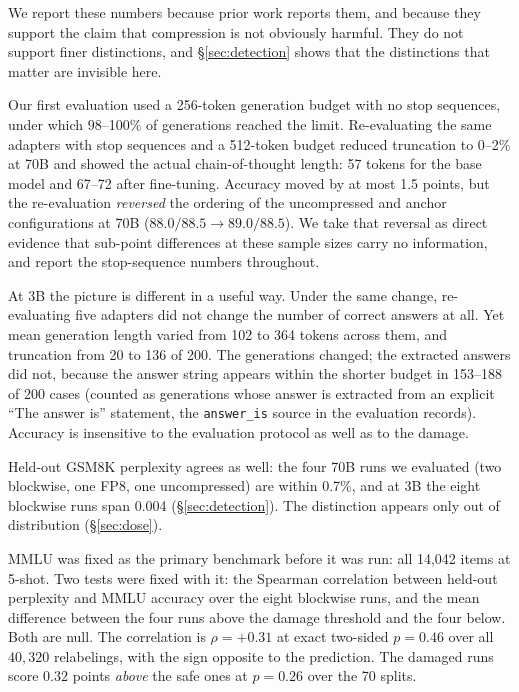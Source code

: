 \documentclass[11pt,letterpaper]{article}
\begin{document}
We report these numbers because prior work reports them, and because they support the claim that compression is not obviously harmful. They do not support finer distinctions, and \S\ref{sec:detection} shows that the distinctions that matter are invisible here.

\medskip
Our first evaluation used a 256-token generation budget with no stop sequences, under which 98--100\% of generations reached the limit. Re-evaluating the same adapters with stop sequences and a 512-token budget reduced truncation to 0--2\% at 70B and showed the actual chain-of-thought length: 57 tokens for the base model and 67--72 after fine-tuning. Accuracy moved by at most 1.5 points, but the re-evaluation \emph{reversed} the ordering of the uncompressed and anchor configurations at 70B ($88.0/88.5 \rightarrow 89.0/88.5$). We take that reversal as direct evidence that sub-point differences at these sample sizes carry no information, and report the stop-sequence numbers throughout.

At 3B the picture is different in a useful way. Under the same change, re-evaluating five adapters did not change the number of correct answers at all. Yet mean generation length varied from 102 to 364 tokens across them, and truncation from 20 to 136 of 200. The generations changed; the extracted answers did not, because the answer string appears within the shorter budget in 153--188 of 200 cases (counted as generations whose answer is extracted from an explicit ``The answer is'' statement, the \texttt{answer\_is} source in the evaluation records). Accuracy is insensitive to the evaluation protocol as well as to the damage.

\medskip
Held-out GSM8K perplexity agrees as well: the four 70B runs we evaluated (two blockwise, one FP8, one uncompressed) are within 0.7\%, and at 3B the eight blockwise runs span 0.004 (\S\ref{sec:detection}). The distinction appears only out of distribution (\S\ref{sec:dose}).

\medskip
MMLU was fixed as the primary benchmark before it was run: all 14{,}042 items at 5-shot. Two tests were fixed with it: the Spearman correlation between held-out perplexity and MMLU accuracy over the eight blockwise runs, and the mean difference between the four runs above the damage threshold and the four below. Both are null. The correlation is $\rho = +0.31$ at exact two-sided $p = 0.46$ over all $40{,}320$ relabelings, with the sign opposite to the prediction. The damaged runs score $0.32$ points \emph{above} the safe ones at $p = 0.26$ over the 70 splits.
\end{document}
